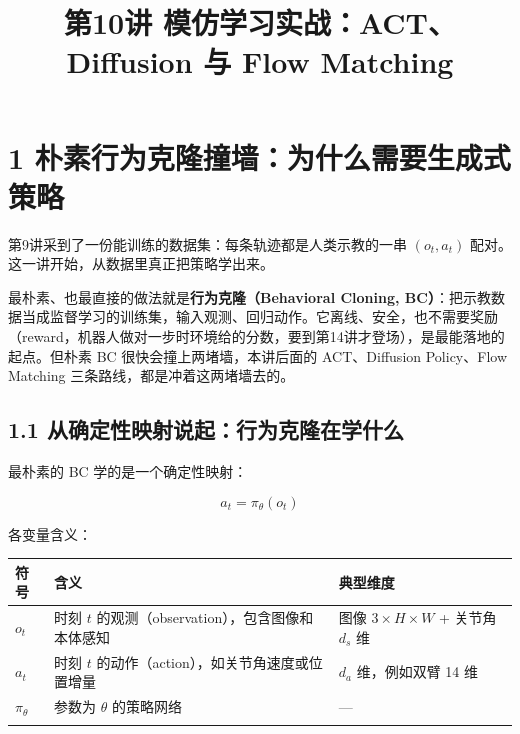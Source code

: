 \documentclass[
  chinese,
]{ctexart}
\title{第10讲 模仿学习实战：ACT、Diffusion 与 Flow Matching}
\author{}
\date{}
\renewcommand*\contentsname{目录}
\newcommand\contentsname{目录}
\begin{document}
\maketitle

\renewcommand*\contentsname{目录}
{
\hypersetup{linkcolor=}
\setcounter{tocdepth}{3}
\tableofcontents
}

\section{1
朴素行为克隆撞墙：为什么需要生成式策略}\label{ux6734ux7d20ux884cux4e3aux514bux9686ux649eux5899ux4e3aux4ec0ux4e48ux9700ux8981ux751fux6210ux5f0fux7b56ux7565}

第9讲采到了一份能训练的数据集：每条轨迹都是人类示教的一串 \((o_t, a_t)\)
配对。这一讲开始，从数据里真正把策略学出来。

最朴素、也最直接的做法就是\textbf{行为克隆（Behavioral Cloning,
BC）}：把示教数据当成监督学习的训练集，输入观测、回归动作。它离线、安全，也不需要奖励（reward，机器人做对一步时环境给的分数，要到第14讲才登场），是最能落地的起点。但朴素
BC 很快会撞上两堵墙，本讲后面的 ACT、Diffusion Policy、Flow Matching
三条路线，都是冲着这两堵墙去的。

\subsection{1.1
从确定性映射说起：行为克隆在学什么}\label{ux4eceux786eux5b9aux6027ux6620ux5c04ux8bf4ux8d77ux884cux4e3aux514bux9686ux5728ux5b66ux4ec0ux4e48}

最朴素的 BC 学的是一个确定性映射：

\[
a_t = \pi_\theta(o_t)
\]

各变量含义：

\begin{center}
\begin{tabular}{@{}>{\raggedright\arraybackslash}p{} >{\raggedright\arraybackslash}p{} >{\raggedright\arraybackslash}p{}@{}}
\toprule\noalign{}
符号 & 含义 & 典型维度 \\
\midrule\noalign{}
\(o_t\) & 时刻 \(t\) 的观测（observation），包含图像和本体感知 & 图像 \(3 \times H \times W\) + 关节角 \(d_s\) 维 \\
\(a_t\) & 时刻 \(t\) 的动作（action），如关节角速度或位置增量 & \(d_a\) 维，例如双臂 14 维 \\
\(\pi_\theta\) & 参数为 \(\theta\) 的策略网络 & --- \\
\bottomrule\noalign{}
\end{tabular}
\end{center}
\end{document}
